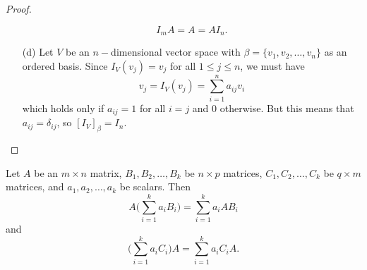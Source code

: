 \begin{proof}
\begin{enumerate}
    \[  {I}_{m} A = A = A {I}_{n}. \]
    \item[(d)] Let \( V  \) be an \( n- \)dimensional vector space with \( \beta = \{ {v}_{1}, {v}_{2}, \dots, {v}_{n} \}  \) as an ordered basis. Since \( {I}_{V}({v}_{j}) = {v}_{j }  \) for all \( 1 \leq j \leq n  \), we must have
        \[  {v}_{j} = {I}_{V}({v}_{j}) = \sum_{ i=1 }^{ n } {a}_{ij} {v}_{i}   \]
        which holds only if \(  {a}_{ij} = 1  \) for all \( i = j  \) and \( 0  \) otherwise. But this means that \( {a}_{ij} = {\delta}_{ij}  \), so \( [{I}_{V}]_{\beta}^{}  = {I}_{n} \).
        
\end{enumerate}
\end{proof}

\begin{corollary}
    Let \( A  \) be an \( m \times n  \) matrix, \( {B}_{1}, {B}_{2}, \dots, {B}_{k } \) be \( n \times  p  \) matrices, \( {C}_{1}, {C}_{2}, \dots ,{C}_{k }  \) be \( q \times  m  \) matrices, and \( {a}_{1}, {a}_{2}, \dots, {a}_{k }  \) be scalars. Then 
    \[  A \Big( \sum_{ i=1 }^{ k  } {a}_{i} {B}_{i}  \Big) = \sum_{ i=1  }^{  k  } {a}_{i} {AB}_{i} \]
    and
    \[ \Big( \sum_{ i=1 }^{ k  } {a}_{i} {C}_{i}  \Big) A = \sum_{ i=1 }^{ k  } {a}_{i} {C}_{i} A. \]
\end{corollary}

